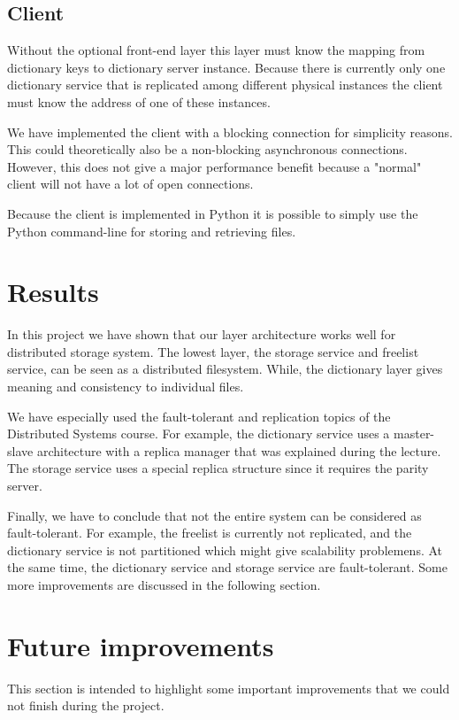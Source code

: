 \documentclass[12pt,a4paper]{scrartcl}
\begin{document}
\subsection{Client}
Without the optional front-end layer this layer must know the mapping from dictionary keys to dictionary server instance. Because there is currently only one dictionary service that is replicated among different physical instances the client must know the address of one of these instances.

We have implemented the client with a blocking connection for simplicity reasons. This could theoretically also be a non-blocking asynchronous connections. However, this does not give a major performance benefit because a "normal" client will not have a lot of open connections.

Because the client is implemented in Python it is possible to simply use the Python command-line for storing and retrieving files.

\section{Results}
In this project we have shown that our layer architecture works well for distributed storage system. The lowest layer, the storage service and freelist service, can be seen as a distributed filesystem. While, the dictionary layer gives meaning and consistency to individual files.

We have especially used the fault-tolerant and replication topics of the Distributed Systems course. For example, the dictionary service uses a master-slave architecture with a replica manager that was explained during the lecture. The storage service uses a special replica structure since it requires the parity server.

Finally, we have to conclude that not the entire system can be considered as fault-tolerant. For example, the freelist is currently not replicated, and the dictionary service is not partitioned which might give scalability problemens. At the same time, the dictionary service and storage service are fault-tolerant. Some more improvements are discussed in the following section.

\section{Future improvements}
This section is intended to highlight some important improvements that we could not finish during the project.
\end{document}
